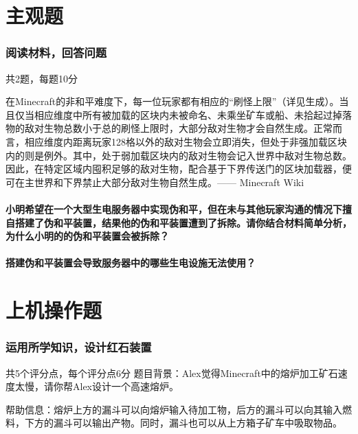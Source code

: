 \documentclass{exampaper}
\begin{document}
        \clearpage

    \part{主观题}
        \section{阅读材料，回答问题}{共2题，每题10分}
            \begin{material}
                在Minecraft的非和平难度下，每一位玩家都有相应的“刷怪上限”（详见生成）。当且仅当相应维度中所有被加载的区块内未被命名、未乘坐矿车或船、未拾起过掉落物的敌对生物总数小于总的刷怪上限时，大部分敌对生物才会自然生成。正常而言，相应维度内距离玩家128格以外的敌对生物会立即消失，但处于非强加载区块内的则是例外。其中，处于弱加载区块内的敌对生物会记入世界中敌对生物总数。因此，在特定区域内囤积足够的敌对生物，配合基于下界传送门的区块加载器，便可在主世界和下界禁止大部分敌对生物自然生成。—— Minecraft Wiki
            \end{material}

            \subsection{小明希望在一个大型生电服务器中实现伪和平，但在未与其他玩家沟通的情况下擅自搭建了伪和平装置，结果他的伪和平装置遭到了拆除。请你结合材料简单分析，为什么小明的的伪和平装置会被拆除？}
                \vspace{2cm}
            
            \subsection{搭建伪和平装置会导致服务器中的哪些生电设施无法使用？}
                \vspace{2cm}
        
    \part{上机操作题}
        \section{运用所学知识，设计红石装置}{共5个评分点，每个评分点6分}
            题目背景：Alex觉得Minecraft中的熔炉加工矿石速度太慢，请你帮Alex设计一个高速熔炉。

            帮助信息：熔炉上方的漏斗可以向熔炉输入待加工物，后方的漏斗可以向其输入燃料，下方的漏斗可以输出产物。同时，漏斗也可以从上方箱子矿车中吸取物品。
\end{document}
